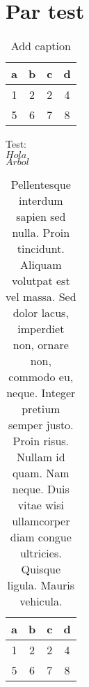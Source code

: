 %
%

\section{Par test}

\begin{table}[htbp]
	\centering
	\caption{Add caption}
	{\begin{tabular}{|c|c|c|c|}
			\hline
			a     & b     & c     & d \bigstrut\\
			\hline
			1     & 2     & 2     & 4 \bigstrut\\
			\hline
			5     & 6     & 7     & 8 \bigstrut\\
			\hline
		\end{tabular}%
	}
	\label{tab:addlabel2}%
\end{table}%

Test:\\
$Hola$\\
$Arbol$\\



\begin{table}[htbp]
	\centering
	\caption{Pellentesque interdum sapien sed nulla. Proin tincidunt. Aliquam volutpat est vel
		massa. Sed dolor lacus, imperdiet non, ornare non, commodo eu, neque. Integer pretium semper
		justo. Proin risus. Nullam id quam. Nam neque. Duis vitae wisi ullamcorper diam congue
		ultricies. Quisque ligula. Mauris vehicula.}
	\begin{tabular}{|c|c|c|c|}
		\hline
		a     & b     & c     & d \bigstrut\\
		\hline
		1     & 2     & 2     & 4 \bigstrut\\
		\hline
		5     & 6     & 7     & 8 \bigstrut\\
		\hline
	\end{tabular}%
	\label{tab:addlabel}%
\end{table}%

